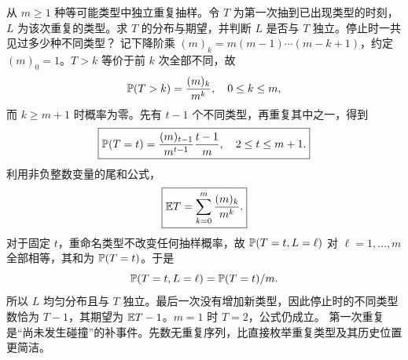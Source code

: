 从 $m\ge1$ 种等可能类型中独立重复抽样。令 $T$ 为第一次抽到已出现类型的时刻，$L$ 为该次重复的类型。求 $T$ 的分布与期望，并判断 $L$ 是否与 $T$ 独立。停止时一共见过多少种不同类型？
\solution 记下降阶乘 $(m)_k=m(m-1)\cdots(m-k+1)$，约定 $(m)_0=1$。$T>k$ 等价于前 $k$ 次全部不同，故
\[
\mathbb{P}(T>k)=\frac{(m)_k}{m^k},\quad0\le k\le m,
\]
而 $k\ge m+1$ 时概率为零。先有 $t-1$ 个不同类型，再重复其中之一，得到
\[
\boxed{\mathbb{P}(T=t)=\frac{(m)_{t-1}}{m^{t-1}}\frac{t-1}{m},
\quad2\le t\le m+1.}
\]
利用非负整数变量的尾和公式，
\[
\boxed{\mathbb{E} T=\sum_{k=0}^m\frac{(m)_k}{m^k}.}
\]
对于固定 $t$，重命名类型不改变任何抽样概率，故 $\mathbb{P}(T=t,L=\ell)$ 对 $\ell=1,\ldots,m$ 全部相等，其和为 $\mathbb{P}(T=t)$。于是
\[
\mathbb{P}(T=t,L=\ell)=\mathbb{P}(T=t)/m.
\]
所以 $L$ 均匀分布且与 $T$ 独立。最后一次没有增加新类型，因此停止时的不同类型数恰为 $T-1$，其期望为 $\mathbb{E} T-1$。$m=1$ 时 $T=2$，公式仍成立。
\insight 第一次重复是“尚未发生碰撞”的补事件。先数无重复序列，比直接枚举重复类型及其历史位置更简洁。
